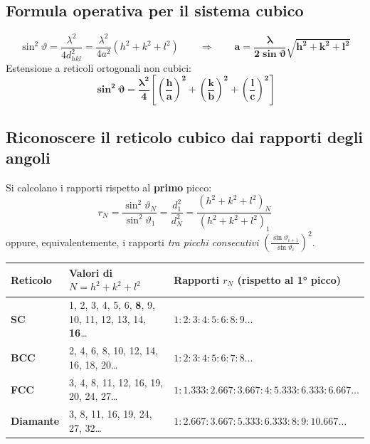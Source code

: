 
\subsection{Formula operativa per il sistema cubico}
\[ \sin^2\vartheta = \frac{\lambda^2}{4 d_{hkl}^2} = \frac{\lambda^2}{4a^2}(h^2+k^2+l^2)
   \qquad\Longrightarrow\qquad
   \bm{a = \frac{\lambda}{2\sin\vartheta}\sqrt{h^2+k^2+l^2}} \]
Estensione a reticoli ortogonali non cubici:
\[ \bm{\sin^2\vartheta = \frac{\lambda^2}{4}\left[\left(\frac{h}{a}\right)^2+\left(\frac{k}{b}\right)^2+\left(\frac{l}{c}\right)^2\right]} \]

\subsection{Riconoscere il reticolo cubico dai rapporti degli angoli}
Si calcolano i rapporti rispetto al \textbf{primo} picco:
\[ r_N = \frac{\sin^2\vartheta_N}{\sin^2\vartheta_1} = \frac{d_1^2}{d_N^2}
      = \frac{(h^2+k^2+l^2)_N}{(h^2+k^2+l^2)_1} \]
oppure, equivalentemente, i rapporti \emph{tra picchi consecutivi} $\left(\frac{\sin\vartheta_{i+1}}{\sin\vartheta_i}\right)^2$.

\begin{center}
\renewcommand{\arraystretch}{1.35}
\begin{tabular}{l l l}
\toprule
\textbf{Reticolo} & \textbf{Valori di $N=h^2+k^2+l^2$} & \textbf{Rapporti $r_N$ (rispetto al 1° picco)} \\
\midrule
\textbf{SC} & 1, 2, 3, 4, 5, 6, \textbf{8}, 9, 10, 11, 12, 13, 14, \textbf{16}\dots
            & $1 : 2 : 3 : 4 : 5 : 6 : 8 : 9\dots$ \\
\textbf{BCC} & 2, 4, 6, 8, 10, 12, 14, 16, 18, 20\dots
            & $1 : 2 : 3 : 4 : 5 : 6 : 7 : 8\dots$ \\
\textbf{FCC} & 3, 4, 8, 11, 12, 16, 19, 20, 24, 27\dots
            & $1 : 1.333 : 2.667 : 3.667 : 4 : 5.333 : 6.333 : 6.667\dots$ \\
\textbf{Diamante} & 3, 8, 11, 16, 19, 24, 27, 32\dots
            & $1 : 2.667 : 3.667 : 5.333 : 6.333 : 8 : 9 : 10.667\dots$ \\
\bottomrule
\end{tabular}
\end{center}

